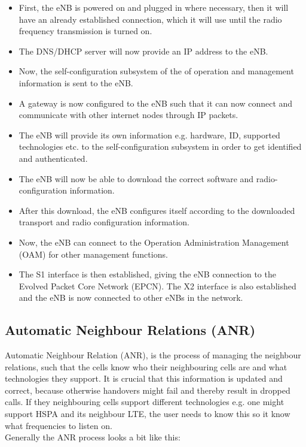 \documentclass{report}
\begin{document}
\begin{itemize}
	\item First, the eNB is powered on and plugged in where necessary, then it will have an already 	established connection, which it will use until the radio frequency transmission is turned on.
	\item The DNS/DHCP server will now provide an IP address to the eNB.
	\item Now, the self-configuration subsystem of the of operation and management information is 		sent to the eNB. 
	\item A gateway is now configured to the eNB such that it can now connect and communicate with other internet nodes through IP packets.
	\item The eNB will provide its own information e.g. hardware, ID, supported technologies etc. to the self-configuration subsystem in order to get identified and authenticated. 
	\item The eNB will now be able to download the correct software and radio-configuration information. 
	\item After this download, the eNB configures itself according to the downloaded transport and radio configuration information. 
	\item Now, the eNB can connect to the Operation Administration Management (OAM) for other management functions.
	\item The S1 interface is then established, giving the eNB connection to the Evolved Packet Core Network (EPCN). The X2 interface is also established and the eNB is now connected to other eNBs in the network. \cite{Atayero2014}
\end{itemize}

\subsection{Automatic Neighbour Relations (ANR)}

Automatic Neighbour Relation (ANR), is the process of managing the neighbour relations, such that the cells know who their neighbouring cells are and what technologies they support. It is crucial that this information is updated and correct, because otherwise handovers might fail and thereby result in dropped calls. If they neighbouring cells support different technologies e.g. one might support HSPA and its neighbour LTE, the user needs to know this so it know what frequencies to listen on. \\ Generally the ANR process looks a bit like this:
\end{document}
